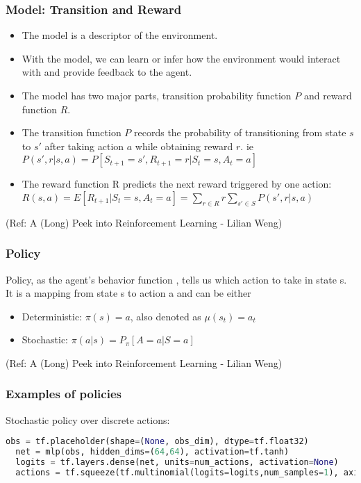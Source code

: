 \begin{frame}[fragile]\frametitle{Model: Transition and Reward}


\begin{itemize}
\item The model is a descriptor of the environment. 
\item With the model, we can learn or infer how the
environment would interact with and provide feedback to the agent. 
\item The model has two major parts, transition probability function $P$ and reward function $R$.
\item The transition function $P$ records the probability of transitioning from state $s$ to $s'$ after taking action $a$
while obtaining reward $r$. ie $P(s',r|s,a)=P[S_{t+1} = s',R_{t+1} = r|S_t = s, A_t = a]$
\item The reward function R predicts the next reward triggered by one action: $R(s,a) = E[R_{t+1} |S_t = s, A_t = a] = \sum_{r \in R} r \sum_{s' \in S}P(s',r|s,a)$
\end{itemize}

{\tiny (Ref: A (Long) Peek into Reinforcement Learning - Lilian Weng)}


\end{frame}

\begin{frame}[fragile]\frametitle{Policy}

Policy, as the agent’s behavior function  , tells us which action to take in state s. It is a mapping from
state s to action a and can be either 

\begin{itemize}
\item Deterministic: $\pi(s)=a$, also denoted as $\mu(s_t)=a_t$
\item Stochastic: $\pi (a|s) = P_{\pi}[A=a|S=a]$
\end{itemize}


{\tiny (Ref: A (Long) Peek into Reinforcement Learning - Lilian Weng)}

\end{frame}

\begin{frame}[fragile]\frametitle{Examples of policies}

Stochastic policy over discrete actions:

\begin{lstlisting}[language=python]
  obs = tf.placeholder(shape=(None, obs_dim), dtype=tf.float32)
  net = mlp(obs, hidden_dims=(64,64), activation=tf.tanh)
  logits = tf.layers.dense(net, units=num_actions, activation=None)
  actions = tf.squeeze(tf.multinomial(logits=logits,num_samples=1), axis=1)
\end{lstlisting}




\end{frame}


